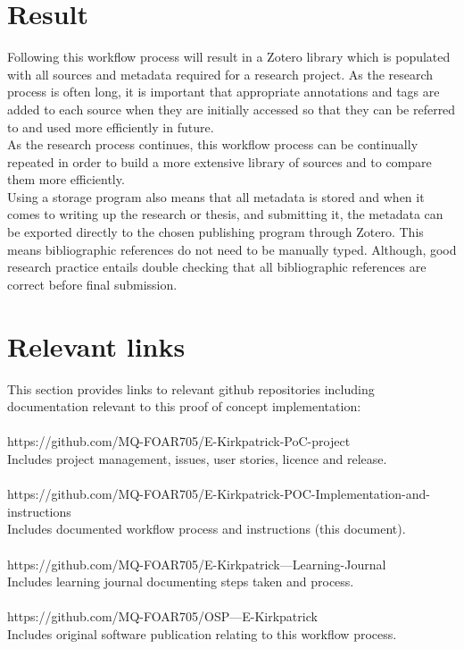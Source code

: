 \documentclass{article}
\begin{document}
\section{Result}
Following this workflow process will result in a Zotero library which is populated with all sources and metadata required for a research project. As the research process is often long, it is important that appropriate annotations and tags are added to each source when they are initially accessed so that they can be referred to and used more efficiently in future.\\
As the research process continues, this workflow process can be continually repeated in order to build a more extensive library of sources and to compare them more efficiently.\\
Using a storage program also means that all metadata is stored and when it comes to writing up the research or thesis, and submitting it, the metadata can be exported directly to the chosen publishing program through Zotero. This means bibliographic references do not need to be manually typed. Although, good research practice entails double checking that all bibliographic references are correct before final submission.

\section{Relevant links}
This section provides links to relevant github repositories including documentation relevant to this proof of concept implementation:\\
\\
https://github.com/MQ-FOAR705/E-Kirkpatrick-PoC-project\\
Includes project management, issues, user stories, licence and release.\\
\\
https://github.com/MQ-FOAR705/E-Kirkpatrick-POC-Implementation-and-instructions\\
Includes documented workflow process and instructions (this document).\\
\\
https://github.com/MQ-FOAR705/E-Kirkpatrick---Learning-Journal\\
Includes learning journal documenting steps taken and process.\\
\\
https://github.com/MQ-FOAR705/OSP---E-Kirkpatrick\\
Includes original software publication relating to this workflow process.
\end{document}
